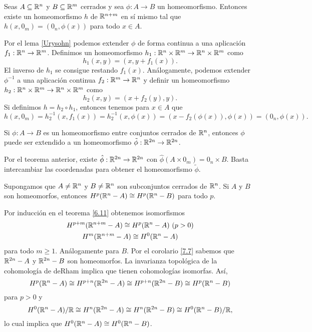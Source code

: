 \documentclass[CV.tex]{subfiles}
\begin{document}
\begin{prop}
Seas $A\subseteq\mathbb{R}^n$ y $B\subseteq\mathbb{R}^m$ cerrados y sea $\phi:A\to B$ un homeomorfismo. Entonces existe un homeomorfismo $h$ de $\mathbb{R}^{n+m}$ en sí mismo tal que $h(x,0_m)=(0_n,\phi(x))$ para todo $x\in A$. 
\end{prop}
\begin{dem}
Por el lema \ref{Urysohn} podemos extender $\phi$ de forma continua a una aplicación $f_1:\mathbb{R}^n\to\mathbb{R}^m$. Definimos un homeomorfismo $h_1:\mathbb{R}^n\times\mathbb{R}^m\to\mathbb{R}^n\times\mathbb{R}^m$ como
\[
h_1(x,y)=(x,y+f_1(x)).
\]
El inverso de $h_1$ se consigue restando $f_1(x)$. Análogamente, podemos extender $\phi^{-1}$ a una aplicación continua $f_2:\mathbb{R}^m\to\mathbb{R}^n$ y definir un homeomorfismo $h_2:\mathbb{R}^n\times\mathbb{R}^m\to\mathbb{R}^n\times\mathbb{R}^m$ como
\[
h_2(x,y)=(x+f_2(y),y).
\]
Si definimos $h=h_2\circ h_1$, entonces tenemos para $x\in A$ que
\[
h(x,0_m)=h_2^{-1}(x,f_1(x))=h_2^{-1}(x,\phi(x))=(x-f_2(\phi(x)),\phi(x))=(0_n,\phi(x)).
\]
\QED
\end{dem}

\begin{coro}\label{7.7}
Si $\phi:A\to B$ es un homeomorfismo entre conjuntos cerrados de $\mathbb{R}^n$, entonces $\phi$ puede ser extendido a un homeomorfismo $\tilde{\phi}:\mathbb{R}^{2n}\to \mathbb{R}^{2n}$.
\end{coro}
\begin{dem}
Por el teorema anterior, existe $\hat{\phi}:\mathbb{R}^{2n}\to\mathbb{R}^{2n}$ con $\hat{\phi}(A\times 0_m)=0_n\times B$. Basta intercambiar las coordenadas para obtener el homeomorfismo $\tilde{\phi}$. \QED
\end{dem}

\begin{teorema}
Supongamos que $A\neq\mathbb{R}^n$ y $B\neq\mathbb{R}^n$ son subconjuntos cerrados de $\mathbb{R}^n$. Si $A$ y $B$ son homeomorfos, entonces $H^p(\mathbb{R}^n-A)\cong H^p(\mathbb{R}^n-B)$ para todo $p$.
\end{teorema}
\begin{dem}
Por inducción en el teorema \ref{6.11} obtenemos isomorfismos 
\begin{gather*}
H^{p+m}(\mathbb{R}^{n+m}-A)\cong H^p(\mathbb{R}^n-A)\ (p>0)\\
H^m(\mathbb{R}^{n+m}-A)\cong H^0(\mathbb{R}^n-A)
\end{gather*}
para todo $m\geq 1$. Análogamente para $B$. Por el corolario \ref{7.7} sabemos que $\mathbb{R}^{2n}-A$ y $\mathbb{R}^{2n}-B$ son homeomorfos. La invarianza topológica de la cohomología de deRham implica que tienen cohomologías isomorfas. Así,
\[
H^p(\mathbb{R}^n-A)\cong H^{p+n}(\mathbb{R}^{2n}-A)\cong H^{p+n}(\mathbb{R}^{2n}-B)\cong H^p(\mathbb{R}^n-B)
\]
para $p>0$ y 
\[
H^0(\mathbb{R}^n-A)/\mathbb{R}\cong H^{n}(\mathbb{R}^{2n}-A)\cong H^{n}(\mathbb{R}^{2n}-B)\cong H^0(\mathbb{R}^n-B)/\mathbb{R},
\]
lo cual implica que $H^0(\mathbb{R}^n-A)\cong H^0(\mathbb{R}^n-B)$.%
\QED
\end{dem}
\end{document}

